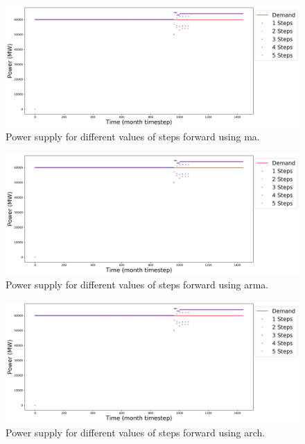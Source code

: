 \documentclass[11pt]{article}
\begin{document}
\begin{figure}[H]
	\centering
	\includegraphics[width=\textwidth]{29-figures/29-power-buffer0-ma-steps.png} 
	\hfill
	\caption{Power supply for different values of steps forward using ma.}
	\label{fig:29-ste-ma}
\end{figure}

\begin{figure}[H]
	\centering
	\includegraphics[width=\textwidth]{29-figures/29-power-buffer0-arma-steps.png} 
	\hfill
	\caption{Power supply for different values of steps forward using arma.}
	\label{fig:29-ste-arma}
\end{figure}

\begin{figure}[H]
	\centering
	\includegraphics[width=\textwidth]{29-figures/29-power-buffer0-arch-steps.png} 
	\hfill
	\caption{Power supply for different values of steps forward using arch.}
	\label{fig:29-ste-arch}
\end{figure}
\end{document}
